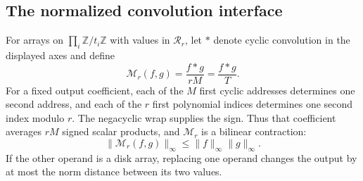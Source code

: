 \subsection{The normalized convolution interface}

For arrays on $\prod_i\mathbb Z/t_i\mathbb Z$ with values in
$\mathcal R_r$, let $*$ denote cyclic convolution in the displayed
axes and define
\[
       \mathcal M_r(f,g)=\frac{f*g}{rM}=\frac{f*g}{T}.
\]
For a fixed output coefficient, each of the $M$ first cyclic
addresses determines one second address, and each of the $r$ first
polynomial indices determines one second index modulo $r$.  The
negacyclic wrap supplies the sign.  Thus that coefficient averages
$rM$ signed scalar products, and $\mathcal M_r$ is a bilinear
contraction:
\[
 \|\mathcal M_r(f,g)\|_\infty
       \leq\|f\|_\infty\|g\|_\infty.
\]
If the other operand is a disk array, replacing one operand changes
the output by at most the norm distance between its two values.

